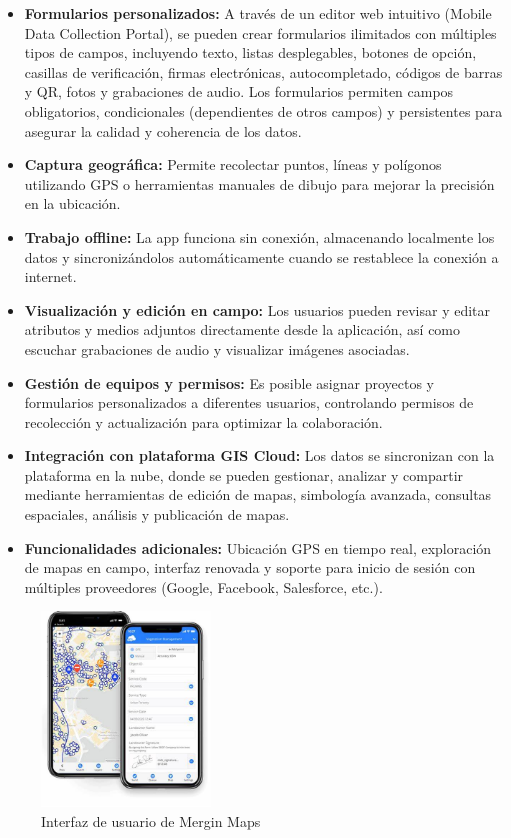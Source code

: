\documentclass{article}
\begin{document}
\begin{itemize}
\item \textbf{Formularios personalizados:} A través de un editor web intuitivo (Mobile Data Collection Portal), se pueden crear formularios ilimitados con múltiples tipos de campos, incluyendo texto, listas desplegables, botones de opción, casillas de verificación, firmas electrónicas, autocompletado, códigos de barras y QR, fotos y grabaciones de audio. Los formularios permiten campos obligatorios, condicionales (dependientes de otros campos) y persistentes para asegurar la calidad y coherencia de los datos.

\item \textbf{Captura geográfica:} Permite recolectar puntos, líneas y polígonos utilizando GPS o herramientas manuales de dibujo para mejorar la precisión en la ubicación.

\item \textbf{Trabajo offline:} La app funciona sin conexión, almacenando localmente los datos y sincronizándolos automáticamente cuando se restablece la conexión a internet.

\item \textbf{Visualización y edición en campo:} Los usuarios pueden revisar y editar atributos y medios adjuntos directamente desde la aplicación, así como escuchar grabaciones de audio y visualizar imágenes asociadas.

\item \textbf{Gestión de equipos y permisos:} Es posible asignar proyectos y formularios personalizados a diferentes usuarios, controlando permisos de recolección y actualización para optimizar la colaboración.

\item \textbf{Integración con plataforma GIS Cloud:} Los datos se sincronizan con la plataforma en la nube, donde se pueden gestionar, analizar y compartir mediante herramientas de edición de mapas, simbología avanzada, consultas espaciales, análisis y publicación de mapas.

\item \textbf{Funcionalidades adicionales:} Ubicación GPS en tiempo real, exploración de mapas en campo, interfaz renovada y soporte para inicio de sesión con múltiples proveedores (Google, Facebook, Salesforce, etc.).
\end{itemize}

\begin{figure}[h]
  \centering
  \includegraphics[width=0.4\textwidth]{images/gis_cloud_forms.jpeg}
  \caption{Interfaz de usuario de Mergin Maps}
  \label{fig:giscloudform}
\end{figure}
\end{document}
